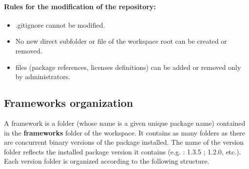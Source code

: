 \documentclass[12pt,a4paper]{article}
\begin{document}
\paragraph{Rules for the modification of the repository:}
\begin{itemize}
\item .gitignore cannot be modified.
\item No new direct subfolder or file of the workspace root can be created or removed.
\item files (package references, licenses definitions) can be added or removed only by administrators.
\end{itemize}


\subsection{Frameworks organization}
A framework is a folder (whose name is a given unique package name) contained in the \textbf{frameworks} folder of the workspace. It contains as many folders as there are concurrent binary versions of the package installed. The name of the version folder reflects the installed package version it contains (e.g. : 1.3.5 ; 1.2.0, etc.). Each version folder is organized according to the following structure. 
\end{document}
